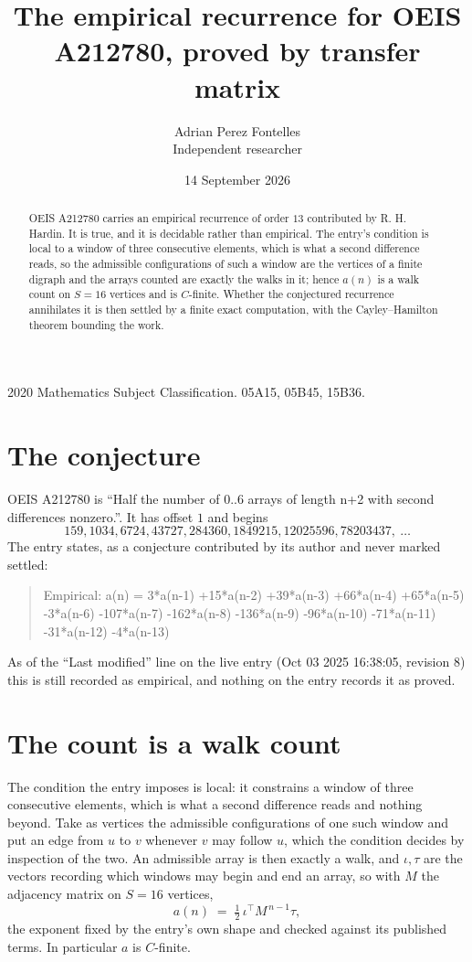 \documentclass[11pt,a4paper]{article}
\title{The empirical recurrence for OEIS A212780, proved by transfer matrix}
\author{Adrian Perez Fontelles\\ \small Independent researcher}
\date{14 September 2026}
\theoremstyle{plain}
\theoremstyle{definition}
\begin{document}
\maketitle

\begin{abstract}
OEIS A212780 carries an empirical recurrence of order $13$ contributed by R. H. Hardin. It is
true, and it is decidable rather than empirical. The entry's condition is local to a window of three consecutive elements, which is what a second difference reads, so
the admissible configurations of such a window are the vertices of a finite digraph and the
arrays counted are exactly the walks in it; hence $a(n)$ is a walk count on $S=16$ vertices
and is $C$-finite. Whether the conjectured recurrence annihilates it is then settled by a
finite exact computation, with the Cayley--Hamilton theorem bounding the work.
\end{abstract}

\noindent\small 2020 Mathematics Subject Classification. 05A15, 05B45, 15B36.\normalsize

\section{The conjecture}

OEIS A212780 is ``Half the number of 0..6 arrays of length n+2 with second differences nonzero.''. It has offset $1$ and begins
\[
159, 1034, 6724, 43727, 284360, 1849215, 12025596, 78203437,\ \dots
\]
The entry states, as a conjecture contributed by its author and never marked settled:
\begin{quote}
Empirical: a(n) = 3*a(n-1) +15*a(n-2) +39*a(n-3) +66*a(n-4) +65*a(n-5) -3*a(n-6) -107*a(n-7) -162*a(n-8) -136*a(n-9) -96*a(n-10) -71*a(n-11) -31*a(n-12) -4*a(n-13)
\end{quote}
As of the ``Last modified'' line on the live entry (Oct 03 2025 16:38:05, revision 8) this is still
recorded as empirical, and nothing on the entry records it as proved.

\section{The count is a walk count}

The condition the entry imposes is local: it constrains a window of three consecutive elements, which is what a second difference reads and nothing beyond. Take as vertices the admissible configurations of one such window and put an edge from $u$ to $v$ whenever $v$ may follow $u$, which the condition decides by inspection of the two.
An admissible array is then exactly a walk, and $\iota,\tau$ are the vectors recording which windows may begin and end an array, so with $M$ the adjacency matrix on $S=16$ vertices,
\[
a(n)\;=\;\tfrac{1}{2}\,\iota^{\!\top}M^{\,n-1}\tau ,
\]
the exponent fixed by the entry's own shape and checked against its published terms. In
particular $a$ is $C$-finite.
\end{document}
